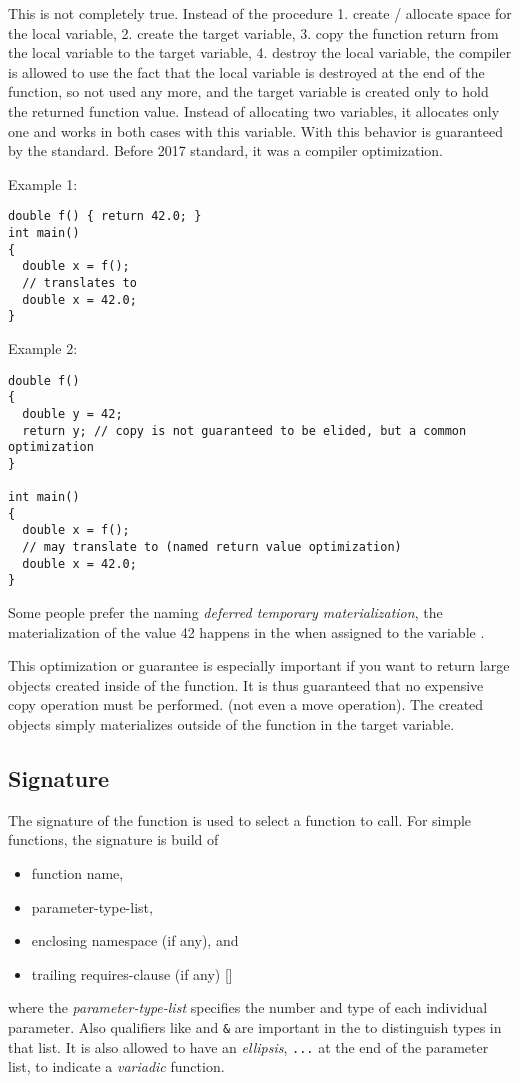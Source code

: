 This is not completely true. Instead of the procedure  1. create / allocate space for the local variable, 2. create the target variable,
3. copy the function return from the local variable to the target variable, 4. destroy the local variable, the compiler is allowed to use the
fact that the local variable is destroyed at the end of the function, so not used any more, and the target variable is created only to hold
the returned function value. Instead of allocating two variables, it allocates only one and works in both cases with this variable.
With \marginpar{[\cxx{17}]} this behavior is guaranteed by the standard. Before 2017 standard, it was a compiler optimization.

Example 1:
\begin{verbatim}
double f() { return 42.0; }
int main()
{
  double x = f();
  // translates to
  double x = 42.0;
}
\end{verbatim}

Example 2:
\begin{verbatim}
double f()
{
  double y = 42;
  return y; // copy is not guaranteed to be elided, but a common optimization
}

int main()
{
  double x = f();
  // may translate to (named return value optimization)
  double x = 42.0;
}
\end{verbatim}

Some people prefer the naming \emph{deferred temporary materialization}, \ie the materialization of the value 42 happens in the  when
assigned to the variable .

This optimization or guarantee is especially important if you want to return large objects created inside of the function. It is thus
guaranteed that no expensive copy operation must be performed. (not even a move operation). The created objects simply materializes outside of
the function in the target variable.


\subsection{Signature\label{sec:function-signature}}
The signature of the function is used to select a function to call. For simple functions, the signature is build of
\begin{itemize}
  \item function name,
  \item parameter-type-list,
  \item enclosing namespace (if any), and
  \item trailing requires-clause (if any) []
\end{itemize}
where the \emph{parameter-type-list} specifies the number and type of each individual parameter. Also qualifiers like  and \texttt{\&}
are important in the to distinguish types in that list. It is also allowed to have an \emph{ellipsis}, \ie \texttt{...} at the end of the parameter
list, to indicate a \emph{variadic} function.

